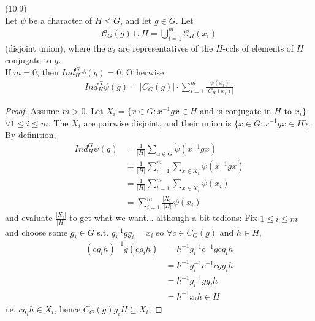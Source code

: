\documentclass[a4paper]{article}
\begin{document}
\begin{lemma} (10.9)\\
Let $\psi$ be a character of $H \leq G$, and let $g \in G$. Let 
\begin{equation*}
\begin{aligned}
\mathcal{C}_G(g) \cup H = \bigcup_{i=1}^m \mathcal{C}_H (x_i)
\end{aligned}
\end{equation*}
(disjoint union), where the $x_i$ are representatives of the $H$-ccls of elements of $H$ conjugate to $g$.\\
If $m =0$, then $Ind_H^G \psi(g) = 0$. Otherwise
\begin{equation*}
\begin{aligned}
Ind_H^G \psi(g) = |C_G(g)| \cdot \sum_{i=1}^m \frac{\psi(x_i)}{|C_H(x_i)|}
\end{aligned}
\end{equation*}
\begin{proof}
Assume $m>0$. Let $X_i = \{x \in G: x^{-1} g x \in H$ and is conjugate in $H$ to $x_i\}$ $\forall 1 \leq i \leq m$.
The $X_i$ are pairwise disjoint, and their union is $\{x \in G: x^{-1} gx \in H\}$. By definition,
\begin{equation*}
\begin{aligned}
Ind_H^G \psi(g) &= \frac{1}{|H|} \sum_{\alpha \in G} \mathring{\psi}(x^{-1}gx)\\
&= \frac{1}{|H|} \sum_{i=1}^m \sum_{x \in X_i} \psi (x^{-1}gx)\\
&= \frac{1}{|H|} \sum_{i=1}^m \sum_{x \in X_i} \psi(x_i)\\
&= \sum_{i=1}^m \frac{|X_i|}{|H|} \psi(x_i)
\end{aligned}
\end{equation*}
and evaluate $\frac{|X_i|}{|H|}$ to get what we want... although a bit tedious: Fix $1 \leq i \leq m$ and choose some $g_i \in G$ s.t. $g_i^{-1} gg_i = x_i$ so $\forall c \in C_G (g)$ and $h \in H$,
\begin{equation*}
\begin{aligned}
(cg_i h)^{-1} g(cg_ih) &= h^{-1}g_i^{-1}c^{-1}gcg_i h\\
&= h^{-1}g_i^{-1} c^{-1}cgg_i h\\
&=h^{-1} g_i^{-1} g g_i h\\
&= h^{-1} x_i h \in H
\end{aligned}
\end{equation*}
i.e. $cg_i h \in X_i$, hence $C_G(g) g_i H \subseteq X_i$;


\end{proof}
\end{lemma}
\end{document}
